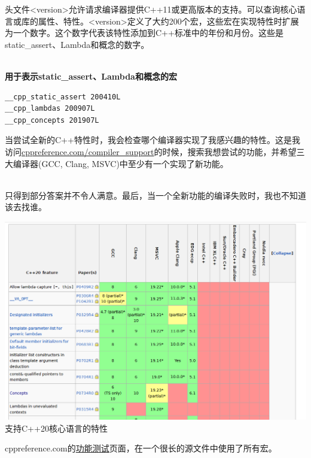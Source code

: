 
头文件<version>允许请求编译器提供C++11或更高版本的支持。可以查询核心语言或库的属性、特性。<version>定义了大约200个宏，这些宏在实现特性时扩展为一个数字。这个数字代表该特性添加到C++标准中的年份和月份。这些是static\_assert、Lambda和概念的数字。

\hspace*{\fill} \\ %
\noindent
\textbf{用于表示static\_assert、Lambda和概念的宏}
\begin{lstlisting}[style=styleCXX]
__cpp_static_assert 200410L
__cpp_lambdas 200907L
__cpp_concepts 201907L
\end{lstlisting}

\begin{tcolorbox}[breakable,enhanced jigsaw,colback=blue!5!white,colframe=blue!75!black,title={支持的功能}]
	
当尝试全新的C++特性时，我会检查哪个编译器实现了我感兴趣的特性。这是我访问\href{https://en.cppreference.com/w/cpp/compiler_support}{cppreference.com/compiler\_support}的时候，搜索我想尝试的功能，并希望三大编译器(GCC, Clang, MSVC)中至少有一个实现了新功能。

\hspace*{\fill} \\ %
只得到部分答案并不令人满意。最后，当一个全新功能的编译失败时，我也不知道该去找谁。
\end{tcolorbox}

\begin{center}
\includegraphics[width=1.0\textwidth]{content/5/chapter9/images/1.png}\\
支持C++20核心语言的特性
\end{center}

cppreference.com的\href{https://en.cppreference.com/w/cpp/feature_test}{功能测试}页面，在一个很长的源文件中使用了所有宏。

